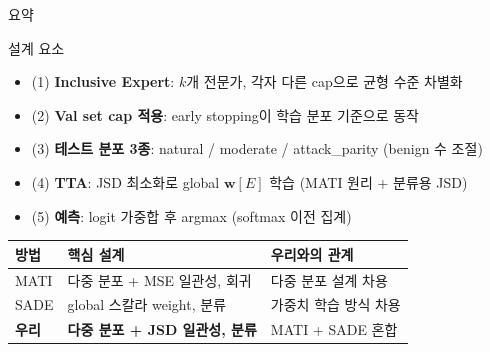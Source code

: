 \documentclass[aspectratio=169]{beamer}
\begin{document}
\begin{frame}{요약}

\begin{block}{설계 요소}
\begin{itemize}
  \item \colorbox{blue!15}{(1)} \textbf{Inclusive Expert}: $k$개 전문가, 각자 다른 cap으로 균형 수준 차별화
  \item \colorbox{green!20}{(2)} \textbf{Val set cap 적용}: early stopping이 학습 분포 기준으로 동작
  \item \colorbox{orange!20}{(3)} \textbf{테스트 분포 3종}: natural / moderate / attack\_parity (benign 수 조절)
  \item \colorbox{purple!15}{(4)} \textbf{TTA}: JSD 최소화로 global $\mathbf{w}[E]$ 학습 (MATI 원리 + 분류용 JSD)
  \item \colorbox{red!15}{(5)} \textbf{예측}: logit 가중합 후 argmax (softmax 이전 집계)
\end{itemize}
\end{block}

\vspace{0.5em}
\begin{tabular}{lll}
\toprule
방법  & 핵심 설계 & 우리와의 관계 \\
\midrule
MATI  & 다중 분포 + MSE 일관성, 회귀  & 다중 분포 설계 차용 \\
SADE  & global 스칼라 weight, 분류  & 가중치 학습 방식 차용 \\
\textbf{우리} & \textbf{다중 분포 + JSD 일관성, 분류} & MATI + SADE 혼합 \\
\bottomrule
\end{tabular}

\end{frame}
\end{document}
